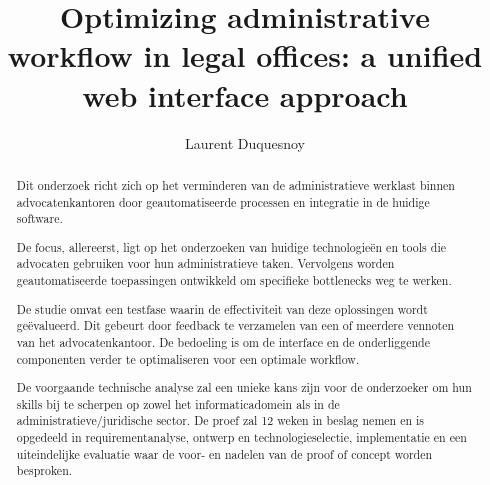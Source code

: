 \documentclass{hogent-article}
\title{Optimizing administrative workflow in legal offices: a unified web interface approach}
\author{Laurent Duquesnoy}
\begin{document}
\begin{abstract}
  Dit onderzoek richt zich op het verminderen van de administratieve werklast binnen advocatenkantoren door geautomatiseerde processen en integratie in de huidige software. 

  De focus, allereerst, ligt op het onderzoeken van huidige technologieën en tools die advocaten gebruiken voor hun administratieve taken. Vervolgens worden geautomatiseerde toepassingen ontwikkeld om specifieke bottlenecks weg te werken. 

  De studie omvat een testfase waarin de effectiviteit van deze oplossingen wordt geëvalueerd. Dit gebeurt door feedback te verzamelen van een of meerdere vennoten van het advocatenkantoor. De bedoeling is om de interface en de onderliggende componenten verder te optimaliseren voor een optimale workflow. 

  De voorgaande technische analyse zal een unieke kans zijn voor de onderzoeker om hun skills bij te scherpen op zowel het informaticadomein als in de administratieve/juridische sector. De proef zal 12 weken in beslag nemen en is opgedeeld in requirementanalyse, ontwerp en technologieselectie, implementatie en een uiteindelijke evaluatie waar de voor- en nadelen van de proof of concept worden besproken. 
\end{abstract}
\tableofcontents



\printbibliography[heading=bibintoc]
\end{document}
